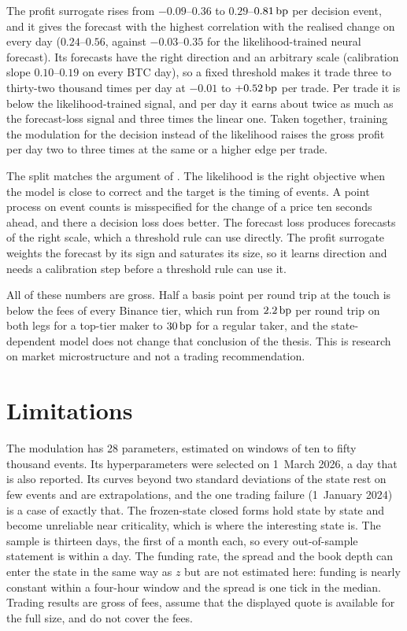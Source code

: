 \documentclass[a4paper,11pt]{article}
\begin{document}
The profit surrogate rises from $-0.09$--$0.36$ to $0.29$--$0.81\,\mathrm{bp}$ per decision event, and it gives the forecast with the highest correlation with the realised change on every day ($0.24$--$0.56$, against $-0.03$--$0.35$ for the likelihood-trained neural forecast). Its forecasts have the right direction and an arbitrary scale (calibration slope $0.10$--$0.19$ on every BTC day), so a fixed threshold makes it trade three to thirty-two thousand times per day at $-0.01$ to $+0.52\,\mathrm{bp}$ per trade. Per trade it is below the likelihood-trained signal, and per day it earns about twice as much as the forecast-loss signal and three times the linear one. Taken together, training the modulation for the decision instead of the likelihood raises the gross profit per day two to three times at the same or a higher edge per trade.

The split matches the argument of \cite{donti2017}. The likelihood is the right objective when the model is close to correct and the target is the timing of events. A point process on event counts is misspecified for the change of a price ten seconds ahead, and there a decision loss does better. The forecast loss produces forecasts of the right scale, which a threshold rule can use directly. The profit surrogate weights the forecast by its sign and saturates its size, so it learns direction and needs a calibration step before a threshold rule can use it.

All of these numbers are gross. Half a basis point per round trip at the touch is below the fees of every Binance tier, which run from $2.2\,\mathrm{bp}$ per round trip on both legs for a top-tier maker to $30\,\mathrm{bp}$ for a regular taker, and the state-dependent model does not change that conclusion of the thesis. This is research on market microstructure and not a trading recommendation.

\section{Limitations}

The modulation has 28 parameters, estimated on windows of ten to fifty thousand events. Its hyperparameters were selected on 1~March 2026, a day that is also reported. Its curves beyond two standard deviations of the state rest on few events and are extrapolations, and the one trading failure (1~January 2024) is a case of exactly that. The frozen-state closed forms hold state by state and become unreliable near criticality, which is where the interesting state is. The sample is thirteen days, the first of a month each, so every out-of-sample statement is within a day. The funding rate, the spread and the book depth can enter the state in the same way as $z$ but are not estimated here: funding is nearly constant within a four-hour window and the spread is one tick in the median. Trading results are gross of fees, assume that the displayed quote is available for the full size, and do not cover the fees.
\end{document}
